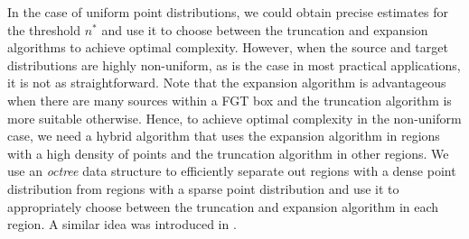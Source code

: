 
 In the case of uniform point distributions, we could obtain precise estimates for the threshold $n^*$ and use it to 
 choose between the truncation and expansion algorithms to achieve optimal complexity. However, when the source and 
 target distributions are highly non-uniform, as is the case in most practical applications, it is not as
 straightforward. Note that the expansion algorithm is advantageous when there are many sources within a FGT box and
 the truncation algorithm is more suitable otherwise. Hence, to achieve optimal complexity in the non-uniform case, we 
 need a hybrid algorithm that uses the expansion algorithm in regions with a high density of points and the 
 truncation algorithm in other regions. We use an {\em octree} \cite{clr90} data structure to efficiently
 separate out regions with a dense point distribution from regions with a sparse point distribution and use
 it to appropriately choose between the truncation and expansion algorithm in each region. A similar idea was
 introduced in \cite{veerapaneni08}. 
 
